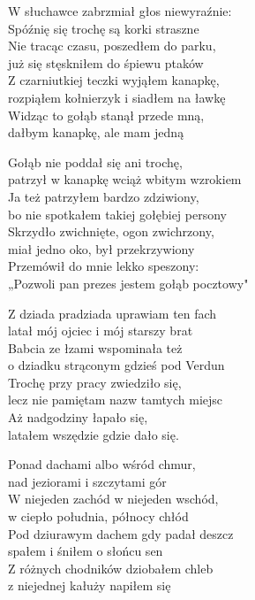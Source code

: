 \begin{text}
    W słuchawce zabrzmiał głos niewyraźnie:\\
    Spóźnię się trochę są korki straszne\\
    Nie tracąc czasu, poszedłem do parku,\\
    już się stęskniłem do śpiewu ptaków\\
    Z czarniutkiej teczki wyjąłem kanapkę,\\
    rozpiąłem kołnierzyk i siadłem na ławkę\\
    Widząc to gołąb stanął przede mną,\\
    dałbym kanapkę, ale mam jedną

    Gołąb nie poddał się ani trochę,\\ 
    patrzył w kanapkę wciąż wbitym wzrokiem\\
    Ja też patrzyłem bardzo zdziwiony,\\
    bo nie spotkałem takiej gołębiej persony\\
    Skrzydło zwichnięte, ogon zwichrzony,\\
    miał jedno oko, był przekrzywiony\\
    Przemówił do mnie lekko speszony:\\
    „Pozwoli pan prezes jestem gołąb pocztowy"

    Z dziada pradziada uprawiam ten fach\\
    latał mój ojciec i mój starszy brat\\
    Babcia ze łzami wspominała też\\ 
    o dziadku strąconym gdzieś pod Verdun\\
    Trochę przy pracy zwiedziło się,\\
    lecz nie pamiętam nazw tamtych miejsc\\
    Aż nadgodziny łapało się,\\
    latałem wszędzie gdzie dało się.

    Ponad dachami albo wśród chmur,\\
    nad jeziorami i szczytami gór\\
    W niejeden zachód w niejeden wschód,\\
    w ciepło południa, północy chłód\\
    Pod dziurawym dachem gdy padał deszcz\\ 
    spałem i śniłem o słońcu sen\\
    Z różnych chodników dziobałem chleb\\
    z niejednej kałuży napiłem się


\end{text}
